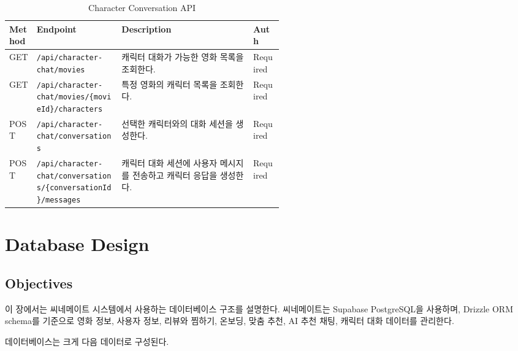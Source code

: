 \documentclass[11pt,a4paper]{article}
\renewcommand{\arraystretch}{1.18}
\begin{document}
\begin{table}[H]
\centering
\footnotesize
\setlength{\tabcolsep}{5pt}
\renewcommand{\arraystretch}{1.28}
\begin{tabularx}{\linewidth}{@{}>{\RaggedRight\arraybackslash}p{0.10\linewidth}>{\RaggedRight\arraybackslash}p{0.31\linewidth}>{\RaggedRight\arraybackslash}X>{\RaggedRight\arraybackslash}p{0.11\linewidth}@{}}
\toprule
\textbf{Method} & \textbf{Endpoint} & \textbf{Description} & \textbf{Auth} \\
\midrule
GET & \texttt{/\allowbreak{}api/\allowbreak{}character-\allowbreak{}chat/\allowbreak{}movies} & 캐릭터 대화가 가능한 영화 목록을 조회한다. & Required \\
GET & \texttt{/\allowbreak{}api/\allowbreak{}character-\allowbreak{}chat/\allowbreak{}movies/\allowbreak{}\{\allowbreak{}movieId\}\allowbreak{}/\allowbreak{}characters} & 특정 영화의 캐릭터 목록을 조회한다. & Required \\
POST & \texttt{/\allowbreak{}api/\allowbreak{}character-\allowbreak{}chat/\allowbreak{}conversations} & 선택한 캐릭터와의 대화 세션을 생성한다. & Required \\
POST & \texttt{/\allowbreak{}api/\allowbreak{}character-\allowbreak{}chat/\allowbreak{}conversations/\allowbreak{}\{\allowbreak{}conversationId\}\allowbreak{}/\allowbreak{}messages} & 캐릭터 대화 세션에 사용자 메시지를 전송하고 캐릭터 응답을 생성한다. & Required \\
\bottomrule
\end{tabularx}
\caption{Character Conversation API}
\end{table}

\clearpage

\hypertarget{database-design}{%
\section{Database Design}\label{database-design}}

\hypertarget{objectives-5}{%
\subsection{Objectives}\label{objectives-5}}

이 장에서는 씨네메이트 시스템에서 사용하는 데이터베이스 구조를 설명한다. 씨네메이트는 Supabase PostgreSQL을 사용하며, Drizzle ORM schema를 기준으로 영화 정보, 사용자 정보, 리뷰와 찜하기, 온보딩, 맞춤 추천, AI 추천 채팅, 캐릭터 대화 데이터를 관리한다.

데이터베이스는 크게 다음 데이터로 구성된다.
\end{document}
